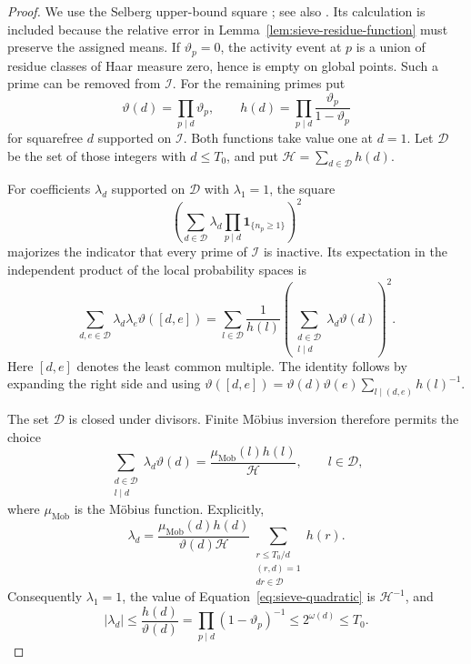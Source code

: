 \begin{proof}
We use the Selberg upper-bound square
\cite{Selberg1947}; see also \cite[Chapter~21]{Koukoulopoulos2019}.
Its calculation is included because the relative error in
Lemma~\ref{lem:sieve-residue-function} must preserve the assigned means.
If $\vartheta_p=0$, the activity event at $p$ is a union of residue classes
of Haar measure zero, hence is empty on global points.  Such a prime can
be removed from $\mathcal I$.  For the remaining primes put
\[
 \vartheta(d)=\prod_{p\mid d}\vartheta_p,\qquad
 h(d)=\prod_{p\mid d}\frac{\vartheta_p}{1-\vartheta_p}
\]
for squarefree $d$ supported on $\mathcal I$.  Both functions take value
one at $d=1$.  Let $\mathcal D$ be the set of those integers with
$d\le T_0$, and put $\mathcal H=\sum_{d\in\mathcal D}h(d)$.

For coefficients $\lambda_d$ supported on $\mathcal D$ with
$\lambda_1=1$, the square
\[
 \left(\sum_{d\in\mathcal D}\lambda_d
       \prod_{p\mid d}\mathbf 1_{\{n_p\ge1\}}\right)^2
\]
majorizes the indicator that every prime of $\mathcal I$ is inactive.
Its expectation in the independent product of the local probability
spaces is
\begin{equation}\label{eq:sieve-quadratic}
 \sum_{d,e\in\mathcal D}\lambda_d\lambda_e\vartheta([d,e])
   =\sum_{l\in\mathcal D}\frac1{h(l)}
       \left(\sum_{\substack{d\in\mathcal D\\l\mid d}}
                      \lambda_d\vartheta(d)\right)^2.
\end{equation}
Here $[d,e]$ denotes the least common multiple.  The identity follows
by expanding the right side and using
$\vartheta([d,e])
 =\vartheta(d)\vartheta(e)\sum_{l\mid(d,e)}h(l)^{-1}$.

The set $\mathcal D$ is closed under divisors.  Finite M\"obius inversion
therefore permits the choice
\[
 \sum_{\substack{d\in\mathcal D\\l\mid d}}\lambda_d\vartheta(d)
       =\frac{\mu_{\mathrm{Mob}}(l)h(l)}{\mathcal H},
 \qquad l\in\mathcal D,
\]
where $\mu_{\mathrm{Mob}}$ is the M\"obius function.  Explicitly,
\[
 \lambda_d=
  \frac{\mu_{\mathrm{Mob}}(d)h(d)}
       {\vartheta(d)\mathcal H}
  \sum_{\substack{r\le T_0/d\\(r,d)=1\\dr\in\mathcal D}}h(r).
\]
Consequently $\lambda_1=1$, the value of
Equation~\eqref{eq:sieve-quadratic} is $\mathcal H^{-1}$, and
\begin{equation}\label{eq:sieve-coefficients}
 |\lambda_d|
 \le\frac{h(d)}{\vartheta(d)}
 =\prod_{p\mid d}(1-\vartheta_p)^{-1}
 \le2^{\omega(d)}\le T_0.
\end{equation}


\end{proof}

